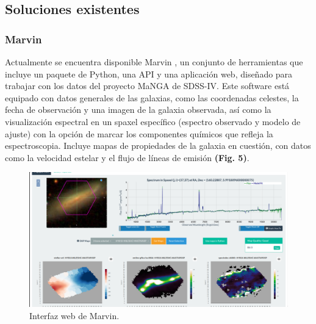 \documentclass[9pt,twocolumn,a4paper]{opticajnl}
\begin{document}
\subsection*{Soluciones existentes}
 \subsubsection*{Marvin}
Actualmente se encuentra disponible Marvin \cite{marvin}, un conjunto de herramientas que incluye un paquete de Python, una API y una aplicación web, diseñado para trabajar con los datos del proyecto MaNGA de SDSS-IV. Este software está equipado con datos generales de las galaxias, como las coordenadas celestes, la fecha de observación y una imagen de la galaxia observada, así como la visualización espectral en un spaxel específico (espectro observado y modelo de ajuste) con la opción de marcar los componentes químicos que refleja la espectroscopia. Incluye mapas de propiedades de la galaxia en cuestión, con datos como la velocidad estelar y el flujo de líneas de emisión \textbf{(Fig. 5)}.
\begin{figure}
	\centering
  	\includegraphics[width=0.8\linewidth]{interfaceMarvin}
	\caption{Interfaz web de Marvin.}
	\label{fig:interfacemarvin}
\end{figure}
\end{document}
